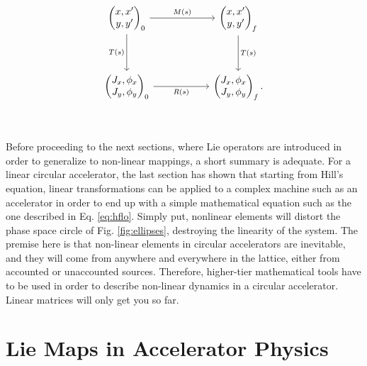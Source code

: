 \begin{equation}\begin{tikzcd}
    {\begin{pmatrix} x,x' \\ y,y' \end{pmatrix}_0} & {} & {\begin{pmatrix} x,x' \\ y,y' \end{pmatrix}_{f}} \\
	\\
	{\begin{pmatrix} J_x,\phi_x \\ J_y,\phi_y \end{pmatrix}_0} & {} & {\begin{pmatrix} J_x,\phi_x \\ J_y,\phi_y \end{pmatrix}_{f}.} \\
	\arrow["{M(s)}", from=1-1, to=1-3]
	\arrow["{T(s)}"', from=1-1, to=3-1]
	\arrow["{R(s)}"', from=3-1, to=3-3]
	\arrow["{T(s)}", from=1-3, to=3-3]
\end{tikzcd}\end{equation}

Before proceeding to the next sections, where Lie operators are introduced in order to generalize to non-linear mappings, a short summary is adequate. For a linear circular accelerator, the last section has shown that starting from Hill's equation, linear transformations can be applied to a complex machine such as an accelerator in order to end up with a simple mathematical equation such as the one described in Eq. \ref{eq:hflo}. Simply put, nonlinear elements will distort the phase space circle of Fig. \ref{fig:ellipses}, destroying the linearity of the system. The premise here is that non-linear elements in circular accelerators are inevitable, and they will come from anywhere and everywhere in the lattice, either from accounted or unaccounted sources. Therefore, higher-tier mathematical tools have to be used in order to describe non-linear dynamics in a circular accelerator. Linear matrices will only get you so far.  

\section{\label{sec:lie}Lie Maps in Accelerator Physics}

